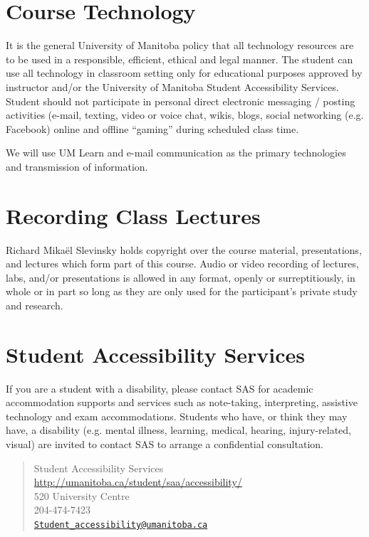 \documentclass[12pt]{article}
\begin{document}
\section{Course Technology}

It is the general University of Manitoba policy that all technology resources are to be used in a responsible, efficient, ethical and legal manner. The student can use all technology in classroom setting only for educational purposes approved by instructor and/or the University of Manitoba Student Accessibility Services. Student should not participate in personal direct electronic messaging / posting activities (e-mail, texting, video or voice chat, wikis, blogs, social networking (e.g. Facebook) online and offline ``gaming'' during scheduled class time.

We will use UM Learn and e-mail communication as the primary technologies and transmission of information.

\section{Recording Class Lectures}

Richard Mika\"el Slevinsky holds copyright over the course material, presentations, and lectures which form part of this course.  Audio or video recording of lectures, labs, and/or presentations is allowed in any format, openly or surreptitiously, in whole or in part so long as they are only used for the participant's private study and research.

\section{Student Accessibility Services}

If you are a student with a disability, please contact SAS for academic accommodation supports and services such as note-taking, interpreting, assistive technology and exam accommodations. Students who have, or think they may have, a disability (e.g. mental illness, learning, medical, hearing, injury-related, visual) are invited to contact SAS to arrange a confidential consultation. 

\begin{quote}
Student Accessibility Services \url{http://umanitoba.ca/student/saa/accessibility/} \\
520 University Centre \\
204-474-7423 \\
\href{mailto:Student_accessibility@umanitoba.ca}{\texttt{Student\_accessibility@umanitoba.ca}}
\end{quote}
\end{document}
